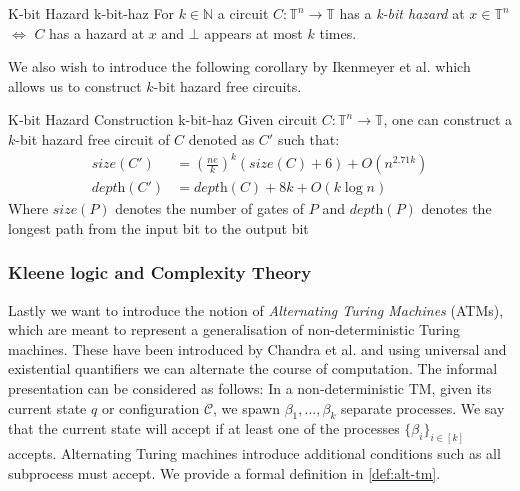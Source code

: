 \begin{definitionbox}{K-bit Hazard \cite{ikenmeyer_ComplexityHazardfreeCircuits_2019}}{k-bit-haz}
    For $k \in \mathbb{N}$ a circuit $C: \mathbb{T}^n \to \mathbb{T}$ has a \textit{k-bit hazard} at $x \in \mathbb{T}^n$
    $\iff$ $C$ has a hazard at $x$ and $\bot$ appears at most $k$ times.
\end{definitionbox}

We also wish to introduce the following corollary by
Ikenmeyer et al. \cite{ikenmeyer_ComplexityHazardfreeCircuits_2019} which allows us
to construct $k$-bit hazard free circuits.

\begin{corollarybox}{K-bit Hazard Construction \cite{ikenmeyer_ComplexityHazardfreeCircuits_2019}}{k-bit-haz}
    Given circuit $C: \mathbb{T}^n \to \mathbb{T}$, one can construct a $k$-bit hazard free circuit of $C$ denoted as $C'$
    such that:
    \begin{align*}
        \textit{size}(C')\, & = \left(\frac{ne}{k}\right)^k (\textit{size}(C) + 6) + O(n^{2.71k}) \\
        \textit{depth}(C')  & = \textit{depth}(C) + 8k + O(k \log n)
    \end{align*}
    Where $\textit{size}(P)$ denotes the number of gates of $P$ and $\textit{depth}(P)$ denotes the longest path from
    the input bit to the output bit
\end{corollarybox}


\subsubsection{Kleene logic and Complexity Theory}
Lastly we want to introduce the notion of \textit{Alternating Turing Machines} (ATMs), which are meant to represent
a generalisation of non-deterministic Turing machines.
These have been introduced by Chandra et al. \cite{chandra1981alternation}
and using universal and existential quantifiers
we can alternate the course of computation. The informal presentation can be considered as follows:
In a non-deterministic TM, given its current state $q$ or configuration $\mathcal{C}$, we spawn
$\beta_1, ..., \beta_k$ separate processes. We say that the current state will accept if at least one of the processes
$\{\beta_i\}_{i \in [k]}$ accepts. Alternating Turing machines introduce additional conditions
such as all subprocess must accept.
We provide a formal definition in \ref{def:alt-tm}.

